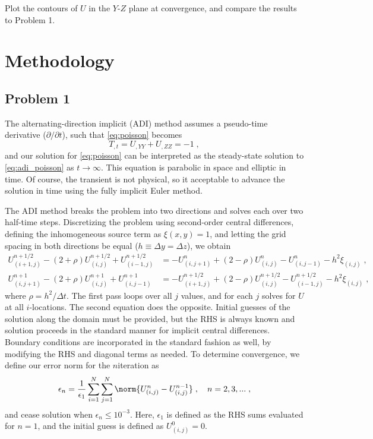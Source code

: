 \documentclass[11pt]{article}
\begin{document}
Plot the contours of $U$ in the $Y$-$Z$ plane at convergence, and compare the results to Problem 1.

\section{Methodology} %

\subsection{Problem 1}

The alternating-direction implicit (ADI) method assumes a pseudo-time derivative ($\partial/\partial t$), such that \eqref{eq:poisson} becomes
\begin{equation}
T_{,t} = U_{,YY} + U_{,ZZ} = -1
\;,
\label{eq:adi_poisson}
\end{equation}
and our solution for \eqref{eq:poisson} can be interpreted as the steady-state solution to \eqref{eq:adi_poisson} as $t \rightarrow \infty$. This equation is parabolic in space and elliptic in time. Of course, the transient is not physical, so it acceptable to advance the solution in time using the fully implicit Euler method.

The ADI method breaks the problem into two directions and solves each over two half-time steps. Discretizing the problem using second-order central differences, defining the inhomogeneous source term as $\xi(x,y) = 1$, and letting the grid spacing in both directions be equal ($h \equiv \Delta y = \Delta z$), we obtain
\begin{align}
U_{(i+1,j)}^{n+1/2} - (2 + \rho) U_{(i,j)}^{n+1/2} + U_{(i-1,j)}^{n+1/2}
&=
-U_{(i,j+1)}^{n} + (2 - \rho) U_{(i,j)}^{n} - U_{(i,j-1)}^{n} - h^2 \xi_{(i,j)}
\;, \\
U_{(i,j+1)}^{n+1} - (2 + \rho) U_{(i,j)}^{n+1} + U_{(i,j-1)}^{n+1}
&=
-U_{(i+1,j)}^{n+1/2} + (2 - \rho) U_{(i,j)}^{n+1/2} - U_{(i-1,j)}^{n+1/2} - h^2 \xi_{(i,j)}
\;,
\end{align}
where $\rho = h^2 / \Delta t$. The first pass loops over all $j$ values, and for each $j$ solves for $U$ at all $i$-locations. The second equation does the opposite. Initial guesses of the solution along the domain must be provided, but the RHS is always known and solution proceeds in the standard manner for implicit central differences. Boundary conditions are incorporated in the standard fashion as well, by modifying the RHS and diagonal terms as needed. To determine convergence, we define our error norm for the $n$\th iteration as
\begin{equation}
\epsilon_n = \frac{1}{\epsilon_1} \sum_{i=1}^N \sum_{j=1}^N \norm{U_{(i,j)}^{n} - U_{(i,j)}^{n-1}}
\;, \quad
n = 2, 3, ...
\;,
\end{equation}
and cease solution when $\epsilon_n \le 10^{-3}$. Here, $\epsilon_1$ is defined as the RHS sums evaluated for $n=1$, and the initial guess is defined as $U_{(i,j)}^0 = 0$.
\end{document}
